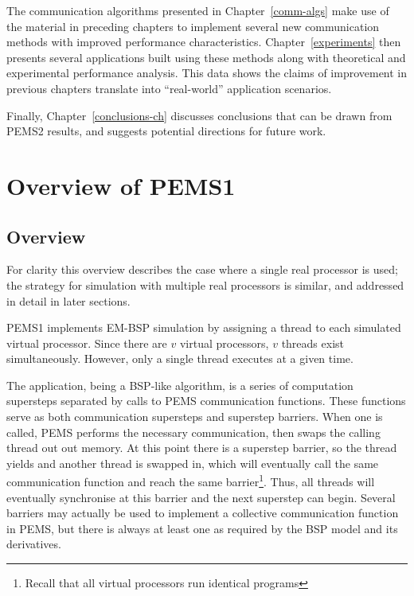 \documentclass[12pt]{carletoncsthesis}
\begin{document}
The communication algorithms presented in Chapter~\ref{comm-algs} make use
of the material in preceding chapters to implement several new communication
methods with improved performance characteristics.  Chapter~\ref{experiments}
then presents several applications built using these methods along with
theoretical and experimental performance analysis.  This data shows the
claims of improvement in previous chapters translate into ``real-world''
application scenarios.

Finally, Chapter~\ref{conclusions-ch} discusses conclusions that can be
drawn from PEMS2 results, and suggests potential directions for future work.


\chapter{Overview of PEMS1}
\thispagestyle{empty}
\label{pems1-ch}


\section{Overview}
\label{overview}


For clarity this overview describes the case where a single real processor
is used; the strategy for simulation with multiple real processors is
similar, and addressed in detail in later sections.

PEMS1 implements EM-BSP simulation by assigning a thread to each simulated
virtual processor.  Since there are $v$ virtual processors, $v$ threads
exist simultaneously.  However, only a single thread executes at a given time.

The application, being a BSP-like algorithm, is a series of computation
supersteps separated by calls to PEMS communication functions.  These functions
serve as both communication supersteps and superstep barriers.  When one is
called, PEMS performs the necessary communication, then swaps the calling
thread out out memory.  At this point there is a superstep barrier, so the
thread yields and another thread is swapped in, which will eventually call
the same communication function and reach the same barrier\footnote{Recall
that all virtual processors run identical programs}.  Thus, all threads will
eventually synchronise at this barrier and the next superstep can begin.
Several barriers may actually be used to implement a collective communication
function in PEMS, but there is always at least one as required by the BSP
model and its derivatives.
\end{document}

